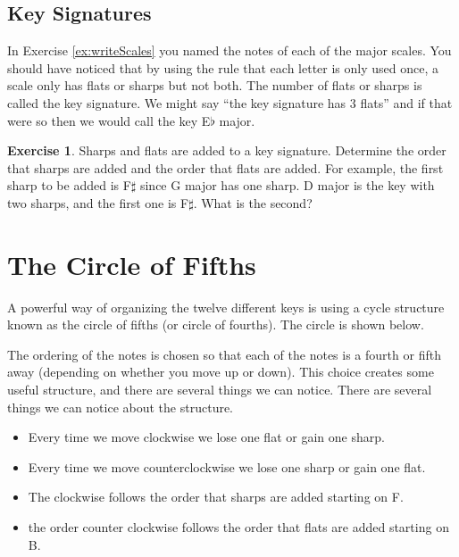 \documentclass[12pt]{article}
\theoremstyle{definition}
\newtheorem{exercise}{Exercise}
\begin{document}
\subsection{Key Signatures}
In Exercise \ref{ex:writeScales} you named the notes of each of the major scales. You should have noticed that by using the rule that each letter is only used once, a scale only has flats or sharps but not both. The number of flats or sharps is called the key signature. 
We might say ``the key signature has 3 flats'' and if that were so then we would call the key E$\flat$ major. 

\begin{exercise}
Sharps and flats are added to a key signature. Determine the order that sharps are added and the order that flats are added. 
For example, the first sharp to be added is F$\sharp$ since G major has one sharp. D major is the key with two sharps, and the first one is F$\sharp$. What is the second?
\end{exercise}

\newpage
\section{The Circle of Fifths}
A powerful way of organizing the twelve different keys is using a cycle structure known as the circle of fifths (or circle of fourths). 
The circle is shown below. 

\begin{center}
\end{center}

The ordering of the notes is chosen so that each of the notes is a fourth or fifth away (depending on whether you move up or down).
This choice creates some useful structure, and there are several things we can notice. 
There are several things we can notice about the structure. 
\begin{itemize}
\item Every time we move clockwise we lose one flat or gain one sharp.
\item Every time we move counterclockwise we lose one sharp or gain one flat.
\item The clockwise follows the order that sharps are added starting on F. 
\item the order counter clockwise follows the order that flats are added starting on B. 
\end{itemize}
\end{document}
